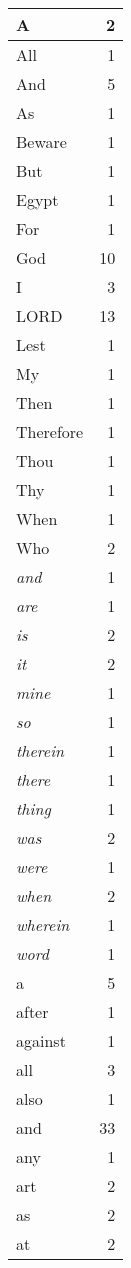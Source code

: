 \begin{center}
\begin{longtable}{l|r}
\hline \hline
\endlastfoot
A & 2 \\ \hline
All & 1 \\ \hline
And & 5 \\ \hline
As & 1 \\ \hline
Beware & 1 \\ \hline
But & 1 \\ \hline
Egypt & 1 \\ \hline
For & 1 \\ \hline
God & 10 \\ \hline
I & 3 \\ \hline
LORD & 13 \\ \hline
Lest & 1 \\ \hline
My & 1 \\ \hline
Then & 1 \\ \hline
Therefore & 1 \\ \hline
Thou & 1 \\ \hline
Thy & 1 \\ \hline
When & 1 \\ \hline
Who & 2 \\ \hline
\emph{and} & 1 \\ \hline
\emph{are} & 1 \\ \hline
\emph{is} & 2 \\ \hline
\emph{it} & 2 \\ \hline
\emph{mine} & 1 \\ \hline
\emph{so} & 1 \\ \hline
\emph{therein} & 1 \\ \hline
\emph{there} & 1 \\ \hline
\emph{thing} & 1 \\ \hline
\emph{was} & 2 \\ \hline
\emph{were} & 1 \\ \hline
\emph{when} & 2 \\ \hline
\emph{wherein} & 1 \\ \hline
\emph{word} & 1 \\ \hline
a & 5 \\ \hline
after & 1 \\ \hline
against & 1 \\ \hline
all & 3 \\ \hline
also & 1 \\ \hline
and & 33 \\ \hline
any & 1 \\ \hline
art & 2 \\ \hline
as & 2 \\ \hline
at & 2 \\ \hline

\end{longtable}
\end{center}
